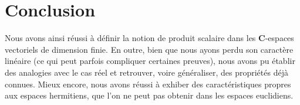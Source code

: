 \documentclass[a4paper,11pt]{article}
\newcommand{\C}{\mathbf{C}}
\begin{document}
\section*{Conclusion}
Nous avons ainsi réussi à définir la notion de produit scalaire dans les $\C$-espaces vectoriels de dimension finie. En outre, bien que nous ayons perdu son caractère linéaire (ce qui peut parfois compliquer certaines preuves), nous avons pu établir des analogies avec le cas réel et retrouver, voire généraliser, des propriétés déjà connues. Mieux encore, nous avons réussi à exhiber des caractéristiques propres aux espaces hermitiens, que l'on ne peut pas obtenir dans les espaces euclidiens. 
\end{document}
